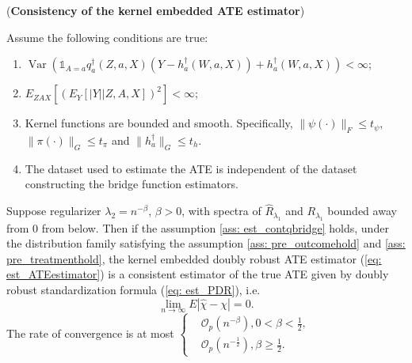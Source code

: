 \begin{theorem}(\textbf{Consistency of the kernel embedded ATE estimator})
    
    \label{thm: est_consistencyATE}
    Assume the following conditions are true: 
    \begin{enumerate}
        \item $\operatorname{Var}(\mathds{1}_{A=a}q_a^{\dagger}(Z,a,X)(Y-h_a^{\dagger}(W,a,X))+h_a^{\dagger}(W,a,X))<\infty$; 
        \item $E_{ZAX}[(E_Y[|Y||Z,A,X])^2] < \infty$;
        \item Kernel functions are bounded and smooth. Specifically, $\|\psi(\cdot)\|_F\leq t_{\psi}$, $\|\pi(\cdot)\|_G\leq t_{\pi}$ and $\|h_a^{\dagger}\|_G\leq t_h$. 
        \item The dataset used to estimate the ATE is independent of the dataset constructing the bridge function estimators. 
    \end{enumerate}
    Suppose regularizer $\lambda_2=n^{-\beta}$, $\beta>0$, with spectra of $\widehat{R}_{\lambda_1}$ and $R_{\lambda_1}$ bounded away from 0 from below.
    Then if the assumption \ref{ass: est_contqbridge} holds, 
    under the distribution family satisfying the assumption \ref{ass: pre_outcomehold} and \ref{ass: pre_treatmenthold}, 
    the kernel embedded doubly robust ATE estimator (\ref{eq: est_ATEestimator}) is a consistent estimator of the true ATE given by doubly robust standardization formula (\ref{eq: est_PDR}), i.e. 
    \begin{equation*}
        \lim_{n\longrightarrow\infty}E|\widehat{\chi}-\chi| = 0.
    \end{equation*}
    The rate of convergence is at most $\left\{\begin{aligned}
        & \mathcal{O}_p(n^{-\beta}), 0<\beta<\frac{1}{2}, \\
        & \mathcal{O}_p(n^{-\frac{1}{2}}), \beta\geq\frac{1}{2}.
    \end{aligned}\right.$
\end{theorem}
